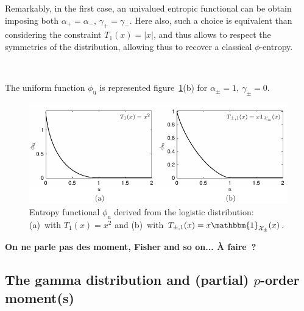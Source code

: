\documentclass[entropy,article,submit,moreauthors,pdftex]{Definitions/mdpi}
\newcommand{\SZ}[1]{{\color{blue} #1}}                                       %
\newcommand{\Avoir}[1]{{\color{red}\bf #1}}                                  %
\def\X{\mathcal{X}}%
\def\un{\mathbbm{1}}%
\def\argtanh{\operatorname{argtanh}}%
\def\u{\mathrm{u}}
\begin{document}
{Remarkably, in  the first case, an  univalued entropic functional can  be obtain
imposing both $\alpha_+ = \alpha_-, \,  \gamma_+ = \gamma_-$.  Here also, such a
choice is  equivalent than considering the  constraint $T_1(x) = |x|$,  and thus
allows to respect the symmetries of the distribution, allowing thus to recover a
classical $\phi$-entropy.

\


The        uniform        function        $\phi_\u$        is        represented
figure~\ref{fig:Entropy-logistic}(b) for $\alpha_\pm = 1, \: \gamma_\pm = 0$.


\begin{figure}[htbp]
\centerline{\includegraphics[width=\columnwidth]{PDF/MaxEnt_LogisticLaw}}
\caption{Entropy  functional  $\phi_\u$   derived  from  the  logistic
  distribution:  (a)~with  $T_1(x)  =  x^2$   and  (b)~with  $T_{\pm,1}(x)  =  x
  \un_{\X_\pm}(x)$.}
\label{fig:Entropy-logistic}
\end{figure}
}

  
\Avoir{On ne parle pas des moment, Fisher and so on... \`A faire~?}



\subsection{The gamma distribution and (partial) $p$-order moment(s)}
\label{subsecapp:GammaFirstOrder}
\end{document}
